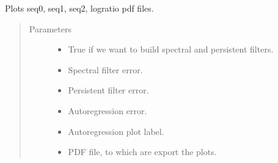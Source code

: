 \documentclass[letterpaper,10pt,english]{sphinxmanual}
\begin{document}

\begin{fulllineitems}
\label{\detokenize{LDS:LDS.OnlineLDS_library.plot_p2}}
\sphinxAtStartPar
Plots seq0, seq1, seq2, logratio pdf files.
\begin{quote}\begin{description}
\item[{Parameters}] \leavevmode\begin{itemize}
\item {} 
\sphinxAtStartPar
{} \textendash{} True if we want to build spectral and persistent filters.

\item {} 
\sphinxAtStartPar
{} \textendash{} Spectral filter error.

\item {} 
\sphinxAtStartPar
{} \textendash{} Persistent filter error.

\item {} 
\sphinxAtStartPar
{} \textendash{} Auto\sphinxhyphen{}regression error.

\item {} 
\sphinxAtStartPar
{} \textendash{} Auto\sphinxhyphen{}regression plot label.

\item {} 
\sphinxAtStartPar
{} \textendash{} PDF file, to which are export the plots.

\end{itemize}

\end{description}\end{quote}

\end{fulllineitems}

\end{document}
